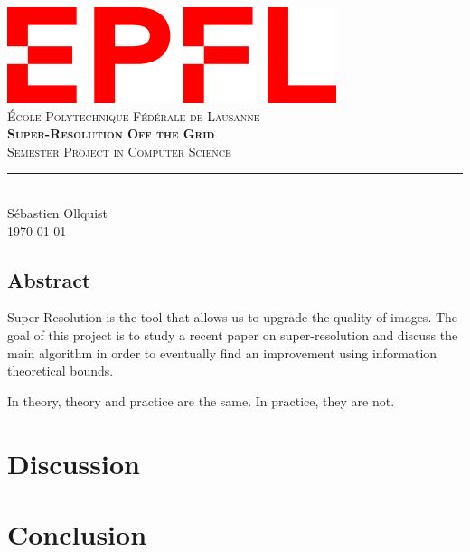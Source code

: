 \documentclass[11pt,titlepage]{report}
\begin{document}
\begin{titlepage}
	\centering
    \includegraphics[width=0.5\linewidth]{images/EPFL.png}\\[0.25cm] 	%
    \textsc{\LARGE École Polytechnique Fédérale de Lausanne}\\ \vspace{\fill}
    \textbf{\textsc{\fontsize{30}{30}\selectfont Super-Resolution Off the Grid}}\\ \vspace{\fill}		
	\textsc{\LARGE Semester Project in Computer Science}\\[0.4cm]
	\rule{\linewidth}{0.2 mm} \\[0.5 cm]
	Sébastien Ollquist \\[2cm] \today
\end{titlepage}
\restoregeometry

\thispagestyle{numberonly}
\begin{summary}
\section*{Abstract}
Super-Resolution is the tool that allows us to upgrade the quality of images. The goal of this project is to study a recent paper on super-resolution and discuss the main algorithm in order to eventually find an improvement using information theoretical bounds.
\end{summary}

\begin{fquote}
    In theory, theory and practice are the same. In practice, they are not.
\end{fquote}
\newpage

\tableofcontents






\chapter{Discussion}

\chapter{Conclusion}

\printbibliography

\appendix


\clearpage
\pagestyle{numberonly}
\end{document}
